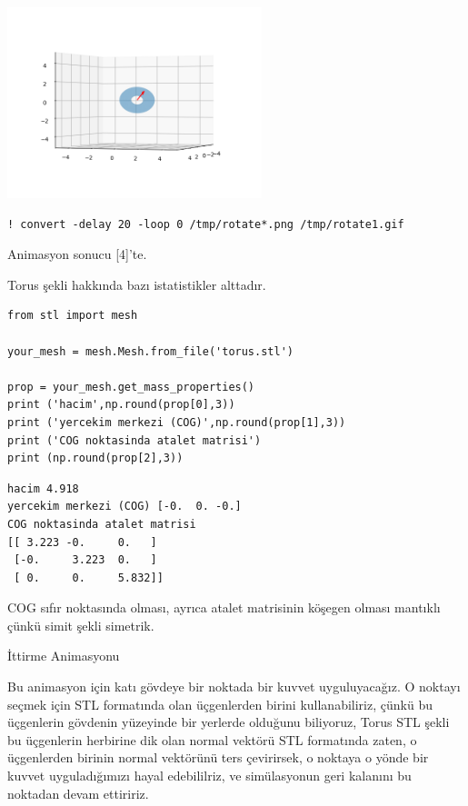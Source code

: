 \documentclass[12pt,fleqn]{article}\usepackage{../../common}
\begin{document}
\includegraphics[width=20em]{sim1/rotate_14.png}

\begin{verbatim}
! convert -delay 20 -loop 0 /tmp/rotate*.png /tmp/rotate1.gif
\end{verbatim}

Animasyon sonucu [4]'te.

Torus şekli hakkında bazı istatistikler alttadır.

\begin{verbatim}
from stl import mesh

your_mesh = mesh.Mesh.from_file('torus.stl')

prop = your_mesh.get_mass_properties()
print ('hacim',np.round(prop[0],3))
print ('yercekim merkezi (COG)',np.round(prop[1],3))
print ('COG noktasinda atalet matrisi')
print (np.round(prop[2],3))
\end{verbatim}

\begin{verbatim}
hacim 4.918
yercekim merkezi (COG) [-0.  0. -0.]
COG noktasinda atalet matrisi
[[ 3.223 -0.     0.   ]
 [-0.     3.223  0.   ]
 [ 0.     0.     5.832]]
\end{verbatim}

COG sıfır noktasında olması, ayrıca atalet matrisinin köşegen olması mantıklı
çünkü simit şekli simetrik.

İttirme Animasyonu

Bu animasyon için katı gövdeye bir noktada bir kuvvet uyguluyacağız. O noktayı
seçmek için STL formatında olan üçgenlerden birini kullanabiliriz, çünkü bu
üçgenlerin gövdenin yüzeyinde bir yerlerde olduğunu biliyoruz, Torus STL şekli
bu üçgenlerin herbirine dik olan normal vektörü STL formatında zaten, o
üçgenlerden birinin normal vektörünü ters çevirirsek, o noktaya o yönde bir
kuvvet uyguladığımızı hayal edebililriz, ve simülasyonun geri kalanını bu
noktadan devam ettiririz.
\end{document}
